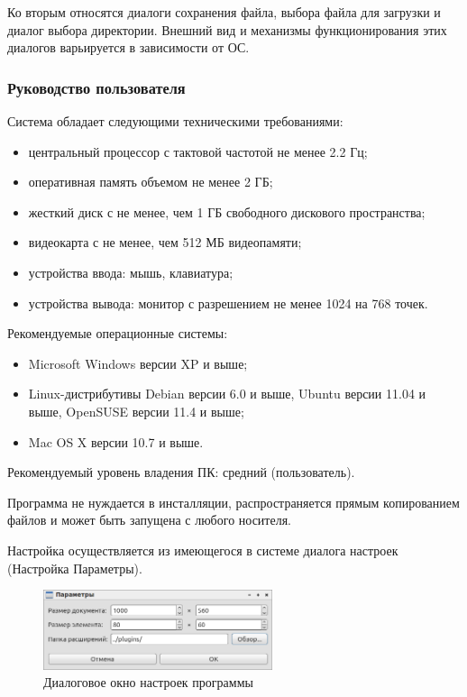 Ко вторым относятся диалоги сохранения файла, выбора файла для загрузки и диалог выбора директории.
Внешний вид и механизмы функционирования этих диалогов варьируется в зависимости от ОС.

\subsubsection{Руководство пользователя}


Система обладает следующими техническими требованиями:
\begin{itemize}
  \item центральный процессор с тактовой частотой не менее 2.2 Гц;
  \item оперативная память объемом не менее 2 ГБ;
  \item жесткий диск с не менее, чем 1 ГБ свободного дискового пространства;
  \item видеокарта с не менее, чем 512 МБ видеопамяти;
  \item устройства ввода: мышь, клавиатура;
  \item устройства вывода: монитор с разрешением не менее 1024 на 768 точек.
\end{itemize}

Рекомендуемые операционные системы:
\begin{itemize}
  \item Microsoft Windows версии XP и выше;
  \item Linux-дистрибутивы Debian версии 6.0 и выше, Ubuntu версии 11.04 и выше, OpenSUSE версии 11.4 и выше;
  \item Mac OS X версии 10.7 и выше.
\end{itemize}

Рекомендуемый уровень владения ПК: средний (пользователь).


Программа не нуждается в инсталляции, распространяется прямым копированием файлов и может быть запущена с любого носителя.

Настройка осуществляется из имеющегося в системе диалога настроек (Настройка \rarr Параметры).
\begin{figure}[H]
  \centering
  \includegraphics[width=0.6\textwidth]{gui/preferences.png}
  \caption{Диалоговое окно настроек программы}
\end{figure}

